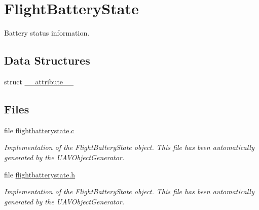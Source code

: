 \hypertarget{group___flight_battery_state}{\section{\-Flight\-Battery\-State}
\label{group___flight_battery_state}
}


\-Battery status information.  


\subsection*{\-Data \-Structures}
\begin{DoxyCompactItemize}
\item 
struct \hyperlink{struct____attribute____}{\-\_\-\-\_\-attribute\-\_\-\-\_\-}
\end{DoxyCompactItemize}
\subsection*{\-Files}
\begin{DoxyCompactItemize}
\item 
file \hyperlink{flightbatterystate_8c}{flightbatterystate.\-c}
\begin{DoxyCompactList}\small\item\em \-Implementation of the \-Flight\-Battery\-State object. \-This file has been automatically generated by the \-U\-A\-V\-Object\-Generator. \end{DoxyCompactList}\item 
file \hyperlink{flightbatterystate_8h}{flightbatterystate.\-h}
\begin{DoxyCompactList}\small\item\em \-Implementation of the \-Flight\-Battery\-State object. \-This file has been automatically generated by the \-U\-A\-V\-Object\-Generator. \end{DoxyCompactList}\end{DoxyCompactItemize}
